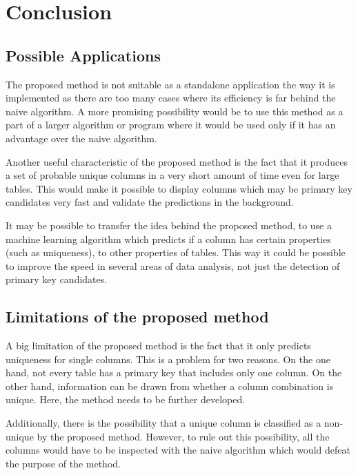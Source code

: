 \chapter{Conclusion}

\section{Possible Applications}
The proposed method is not suitable as a standalone application the way it is implemented as there are too many cases where its efficiency is far behind the naive algorithm. A more promising possibility would be to use this method as a part of a larger algorithm or program where it would be used only if it has an advantage over the naive algorithm.

Another useful characteristic of the proposed method is the fact that it produces a set of probable unique columns in a very short amount of time even for large tables. This would make it possible to display columns which may be primary key candidates very fast and validate the predictions in the background.

It may be possible to transfer the idea behind the proposed method, to use a machine learning algorithm which predicts if a column has certain properties (such as uniqueness), to other properties of tables. This way it could be possible to improve the speed in several areas of data analysis, not just the detection of primary key candidates.


\section{Limitations of the proposed method}
A big limitation of the proposed method is the fact that it only predicts uniqueness for single columns. This is a problem for two reasons. On the one hand, not every table has a primary key that includes only one column. On the other hand, information can be drawn from whether a column combination is unique. Here, the method needs to be further developed.

Additionally, there is the possibility that a unique column is classified as a non-unique by the proposed method. However, to rule out this possibility, all the columns would have to be inspected with the naive algorithm which would defeat the purpose of the method.
